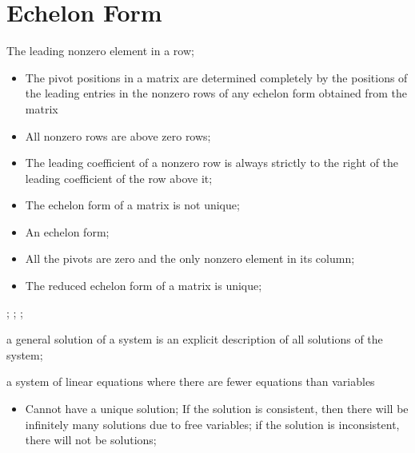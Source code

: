 \section{Echelon Form}

\begin{itemize}
  {The leading nonzero element in a row};
  \begin{itemize}
    \item The pivot positions in a matrix are determined completely by the 
    positions of the leading entries in the nonzero rows of any echelon form 
    obtained from the matrix
  \end{itemize}
  
  \begin{itemize}
    \item All nonzero rows are above zero rows;
    \item The leading coefficient of a nonzero row is always strictly to the 
    right of the leading coefficient of the row above it;
    \item The echelon form of a matrix is not unique;
  \end{itemize}
  
  \begin{itemize}
    \item An echelon form;
    \item All the pivots are zero and the only nonzero element in its column;
    \item The reduced echelon form of a matrix is unique;
  \end{itemize}
  
  ;
  ;
  ;
  
  {a general solution of a system is an explicit description of all solutions of the system};
  
  {a system of linear equations where there are fewer equations than variables}
  \begin{itemize}
    \item Cannot have a unique solution; If the solution is consistent, 
    then there will be infinitely many solutions due to free variables; 
    if the solution is inconsistent, there will not be solutions;
  \end{itemize}
\end{itemize}